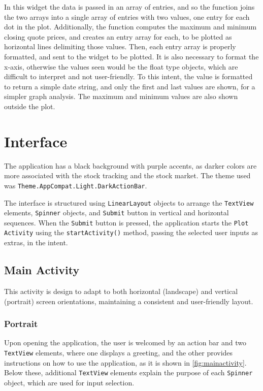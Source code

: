 \documentclass{article}
\begin{document}
In this widget the data is passed in an array of entries, and so the function joins the two arrays into a single array of entries with two values, one entry for each dot in the plot.
Additionally, the function computes the maximum and minimum closing quote prices, and creates an entry array for each, to be plotted as horizontal lines delimiting those values.
Then, each entry array is properly formatted, and sent to the widget to be plotted.
It is also necessary to format the x-axis, otherwise the values seen would be the float type objects, which are difficult to interpret and not user-friendly.
To this intent, the value is formatted to return a simple date string, and only the first and last values are shown, for a simpler graph analysis.
The maximum and minimum values are also shown outside the plot.

\section{Interface}
The application has a black background with purple accents, as darker colors are more associated with the stock tracking and the stock market. The theme used was \texttt{Theme.AppCompat.Light.DarkActionBar}.

The interface is structured using \texttt{LinearLayout} objects to arrange the \texttt{TextView} elements, \texttt{Spinner} objects, and \texttt{Submit} button in vertical and horizontal sequences. When the \texttt{Submit} button is pressed, the application starts the \texttt{Plot Activity} using the \texttt{startActivity()} method, passing the selected user inputs as extras, in the intent.

\subsection{Main Activity}
This activity is design to adapt to both horizontal (landscape) and vertical (portrait) screen orientations, maintaining a consistent and user-friendly layout.

\subsubsection{Portrait}
Upon opening the application, the user is welcomed by an action bar and two \texttt{TextView} elements, where one displays a greeting, and the other provides instructions on how to use the application, as it is shown in \autoref{fig:mainactivity}. 
Below these, additional \texttt{TextView} elements explain the purpose of each \texttt{Spinner} object, which are used for input selection.
\end{document}
